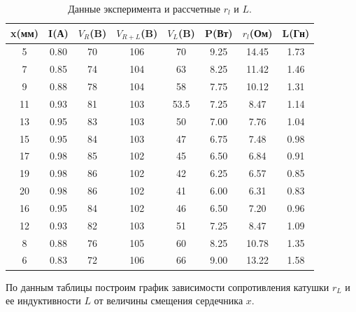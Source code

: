 \documentclass[a4paper,12pt]{article} %
\begin{document}
\begin{table}[H]
\caption{\label{tab:canonsummary} Данные эксперимента и рассчетные $r_l$ и $L$.}
\begin{center}
\begin{tabular}{|c|c|c|c|c|c|c|c|}
\hline
x(мм) & I(А) & $V_R$(B) & $V_{R+L}$(B) & $V_L$(B) & P(Вт) & $r_l$(Ом) & L(Гн)\\
\hline
5 & 0.80 & 70 & 106 & 70 & 9.25 & 14.45 & 1.73 \\
\hline
7 & 0.85 & 74 & 104 & 63 & 8.25 & 11.42 & 1.46 \\
\hline
9 & 0.88 & 78 & 104 & 58 & 7.75 & 10.12 & 1.31 \\
\hline
11 & 0.93 & 81 & 103 & 53.5 & 7.25 & 8.47 & 1.14 \\
\hline
13 & 0.95 & 83 & 103 & 50 & 7.00 & 7.76 & 1.04 \\
\hline
15 & 0.95 & 84 & 103 & 47 & 6.75 & 7.48 & 0.98 \\
\hline
17 & 0.98 & 85 & 102 & 45 & 6.50 & 6.84 & 0.91 \\
\hline
19 & 0.98 & 86 & 102 & 42 & 6.25 & 6.57 & 0.85 \\
\hline
20 & 0.98 & 86 & 102 & 41 & 6.00 & 6.31 & 0.83 \\
\hline
16 & 0.95 & 84 & 102 & 46 & 6.50 & 7.20 & 0.96 \\
\hline
12 & 0.93 & 82 & 103 & 51 & 7.25 & 8.47 & 1.09 \\
\hline
8 & 0.88 & 76 & 105 & 60 & 8.25 & 10.78 & 1.35 \\
\hline
6 & 0.83 & 72 & 106 & 66 & 9.00 & 13.22 & 1.58 \\
\hline
\end{tabular}
\end{center}
\label{table1:ref}
\end{table}

По данным таблицы построим график зависимости сопротивления катушки $r_L$ и ее индуктивности $L$ от величины смещения сердечника $x$.

\begin{figure}[H]\label{rlx}
\label{fig:image}
\end{figure}
\end{document}
